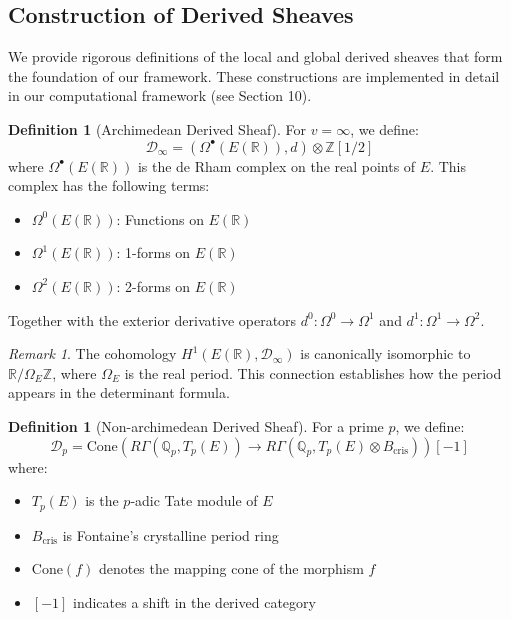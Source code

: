 \documentclass{article}
\theoremstyle{plain}
\theoremstyle{definition}
\newtheorem{definition}[theorem]{Definition}
\theoremstyle{remark}
\newtheorem{remark}[theorem]{Remark}
\begin{document}
\subsection{Construction of Derived Sheaves}

We provide rigorous definitions of the local and global derived sheaves that form the foundation of our framework. These constructions are implemented in detail in our computational framework (see Section 10).

\begin{definition}[Archimedean Derived Sheaf]
For $v = \infty$, we define:
\[
\mathcal{D}_\infty = (\Omega^\bullet(E(\mathbb{R})), d) \otimes \mathbb{Z}[1/2]
\]
where $\Omega^\bullet(E(\mathbb{R}))$ is the de Rham complex on the real points of $E$. This complex has the following terms:
\begin{itemize}
\item $\Omega^0(E(\mathbb{R}))$: Functions on $E(\mathbb{R})$ 
\item $\Omega^1(E(\mathbb{R}))$: 1-forms on $E(\mathbb{R})$
\item $\Omega^2(E(\mathbb{R}))$: 2-forms on $E(\mathbb{R})$
\end{itemize}
Together with the exterior derivative operators $d^0: \Omega^0 \rightarrow \Omega^1$ and $d^1: \Omega^1 \rightarrow \Omega^2$.
\end{definition}

\begin{remark}
The cohomology $H^1(E(\mathbb{R}), \mathcal{D}_\infty)$ is canonically isomorphic to $\mathbb{R}/\Omega_E\mathbb{Z}$, where $\Omega_E$ is the real period. This connection establishes how the period appears in the determinant formula.
\end{remark}

\begin{definition}[Non-archimedean Derived Sheaf]
For a prime $p$, we define:
\[
\mathcal{D}_p = \text{Cone}(R\Gamma(\mathbb{Q}_p, T_p(E)) \to R\Gamma(\mathbb{Q}_p, T_p(E) \otimes B_{\text{cris}}))[-1]
\]
where:
\begin{itemize}
\item $T_p(E)$ is the $p$-adic Tate module of $E$
\item $B_{\text{cris}}$ is Fontaine's crystalline period ring
\item $\text{Cone}(f)$ denotes the mapping cone of the morphism $f$
\item $[-1]$ indicates a shift in the derived category
\end{itemize}
\end{definition}
\end{document}

